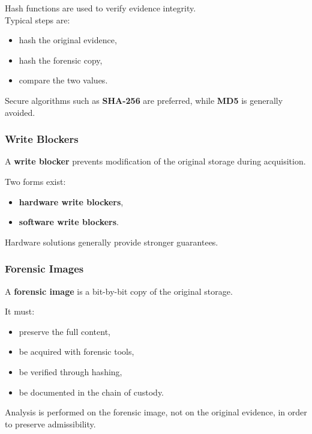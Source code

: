 Hash functions are used to verify evidence integrity.
\\
Typical steps are:

\begin{itemize}
\item hash the original evidence,
\item hash the forensic copy,
\item compare the two values.
\end{itemize}

\noindent
Secure algorithms such as \textbf{SHA-256} are preferred, while \textbf{MD5} is generally avoided.

\subsubsection{Write Blockers}

A \textbf{write blocker} prevents modification of the original storage during acquisition.

Two forms exist:

\begin{itemize}
\item \textbf{hardware write blockers},
\item \textbf{software write blockers}.
\end{itemize}

\noindent
Hardware solutions generally provide stronger guarantees.

\subsubsection{Forensic Images}

A \textbf{forensic image} is a bit-by-bit copy of the original storage.

It must:

\begin{itemize}
\item preserve the full content,
\item be acquired with forensic tools,
\item be verified through hashing,
\item be documented in the chain of custody.
\end{itemize}

\noindent
Analysis is performed on the forensic image, not on the original evidence, in order to preserve admissibility.